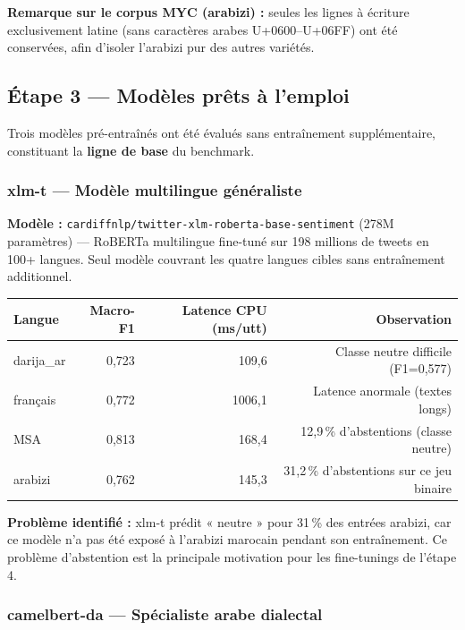 \documentclass[12pt, a4paper]{article}
\begin{document}
\textbf{Remarque sur le corpus MYC (arabizi) :} seules les lignes à écriture
exclusivement latine (sans caractères arabes U+0600–U+06FF) ont été conservées,
afin d'isoler l'arabizi pur des autres variétés.

\subsection{Étape 3 — Modèles prêts à l'emploi}

Trois modèles pré-entraînés ont été évalués sans entraînement supplémentaire,
constituant la \textbf{ligne de base} du benchmark.

\subsubsection{xlm-t — Modèle multilingue généraliste}

\textbf{Modèle :} \texttt{cardiffnlp/twitter-xlm-roberta-base-sentiment}
(278M paramètres) — RoBERTa multilingue fine-tuné sur 198 millions de tweets
en 100+ langues. Seul modèle couvrant les quatre langues cibles sans
entraînement additionnel.

\begin{center}
\begin{tabular}{lrrr}
\toprule
\textbf{Langue} & \textbf{Macro-F1} & \textbf{Latence CPU (ms/utt)} & \textbf{Observation} \\
\midrule
darija\_ar & 0{,}723 & 109{,}6 & Classe neutre difficile (F1=0{,}577) \\
français   & 0{,}772 & 1006{,}1 & Latence anormale (textes longs) \\
MSA        & 0{,}813 & 168{,}4 & 12,9\,\% d'abstentions (classe neutre) \\
arabizi    & 0{,}762 & 145{,}3 & 31,2\,\% d'abstentions sur ce jeu binaire \\
\bottomrule
\end{tabular}
\end{center}

\textbf{Problème identifié :} xlm-t prédit « neutre » pour 31\,\% des
entrées arabizi, car ce modèle n'a pas été exposé à l'arabizi marocain
pendant son entraînement. Ce problème d'abstention est la principale
motivation pour les fine-tunings de l'étape 4.

\subsubsection{camelbert-da — Spécialiste arabe dialectal}
\end{document}
